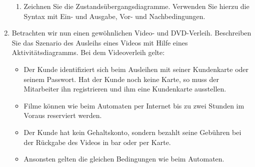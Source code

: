 \documentclass{bschlangaul-aufgabe}
\begin{document}
\begin{enumerate}
\begin{enumerate}
\item Zeichnen Sie die Zustandsübergangsdiagramme. Verwenden Sie hierzu
die Syntax mit Ein- und Ausgabe, Vor- und Nachbedingungen.
\end{enumerate}

\item Betrachten wir nun einen gewöhnlichen Video- und DVD-Verleih.
Beschreiben Sie das Szenario des Ausleihs eines Videos mit Hilfe eines
Aktivitätsdiagramms. Bei dem Videoverleih gelte:

\begin{itemize}
\item Der Kunde identifiziert sich beim Ausleihen mit seiner Kundenkarte
oder seinem Passwort. Hat der Kunde noch keine Karte, so muss der
Mitarbeiter ihn registrieren und ihm eine Kundenkarte ausstellen.

\item Filme können wie beim Automaten per Internet bis zu zwei Stunden
im Voraus reserviert werden.

\item Der Kunde hat kein Gehaltskonto, sondern bezahlt seine Gebühren
bei der Rückgabe des Videos in bar oder per Karte.

\item Ansonsten gelten die gleichen Bedingungen wie beim Automaten.
\end{itemize}
\end{enumerate}
\end{document}
